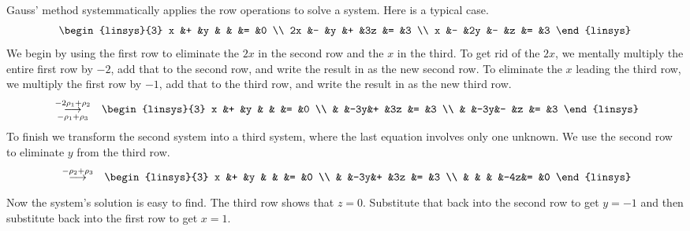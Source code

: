 \begin{example}
Gauss' method systemmatically applies the row operations to solve a system.
Here is a typical case.
\begin{equation*}
  \begin{linsys}{3}
    x  &+  &y  &   &   &=  &0  \\
   2x  &-  &y  &+  &3z &=  &3  \\
    x  &-  &2y &-  &z  &=  &3  
  \end{linsys}
\end{equation*}
We begin by using the first row to 
eliminate the $2x$ in the second row and the $x$ in the third.
To get rid of the $2x$, we mentally multiply the entire first row by $-2$, 
add that to the
second row, and write the result in as the new second row.
To eliminate the $x$ leading the third row, we multiply the first row by
$-1$, add that to the third row, and write the result in as the
new third row.
\begin{eqnarray*}
  &\grstep[-\rho_1 +\rho_3]{-2\rho_1 +\rho_2}
  &\begin{linsys}{3}
     x  &+  &y  &   &   &=  &0  \\
        &   &-3y&+  &3z &=  &3  \\
        &   &-3y&-  &z  &=  &3  
  \end{linsys}   
\end{eqnarray*}
To finish we transform the second system into a third system, where the
last equation involves only one unknown. 
We use 
the second row to eliminate $y$ from the third row.
\begin{eqnarray*}
  &\grstep{-\rho_2 +\rho_3}
  &\begin{linsys}{3}
     x  &+  &y  &   &   &=  &0  \\
        &   &-3y&+  &3z &=  &3  \\
        &   &   &   &-4z&=  &0
   \end{linsys}
\end{eqnarray*}
Now the system's solution is easy to find.
The third row shows that \( z=0 \).
Substitute that back%
into the second row to get \( y=-1 \) and
then substitute back into the first row to get \( x=1 \).
\end{example}

